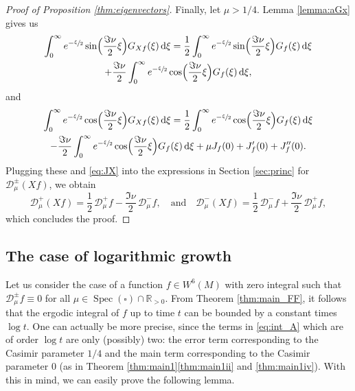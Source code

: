 \documentclass[11pt]{article}
\newcommand \R{\mathbb{R}}
\newcommand*{\diff}{\mathop{}\!\mathrm{d}}
\newcommand{\Dp}[1]{\mathcal{D}_\mu^{+} #1}
\newcommand{\Dm}[1]{\mathcal{D}_\mu^{-} #1}
\newcommand{\Dpm}[1]{\mathcal{D}_\mu^{\pm} #1}
\newcommand{\Dpmp}[1]{\mathcal{D}_\mu^{\pm}(#1)}
\DeclareMathOperator{\Spec}{Spec}
\theoremstyle{definition}
\begin{document}
\begin{proof}[{Proof of Proposition \ref{thm:eigenvectors}}]
Finally, let $\mu > 1/4$. Lemma \ref{lemma:aGx} gives us
\begin{multline*}
\int_0^\infty e^{-\sfrac{\xi}{2}} \sin\Bigl(\frac{\Im\nu}{2}\xi \Bigr) G_{Xf}(\xi) \diff \xi = \frac{1}{2} \int_0^\infty e^{-\sfrac{\xi}{2}} \sin\Bigl(\frac{\Im\nu}{2}\xi \Bigr) G_{f}(\xi) \diff \xi \\
+ \frac{\Im\nu}{2}\int_0^\infty e^{-\sfrac{\xi}{2}} \cos\Bigl(\frac{\Im\nu}{2}\xi \Bigr) G_{f}(\xi) \diff \xi,
\end{multline*}
and
\begin{multline*}
\int_0^\infty e^{-\sfrac{\xi}{2}} \cos\Bigl(\frac{\Im\nu}{2}\xi \Bigr) G_{Xf}(\xi) \diff \xi = \frac{1}{2} \int_0^\infty e^{-\sfrac{\xi}{2}} \cos\Bigl(\frac{\Im\nu}{2}\xi \Bigr) G_{f}(\xi) \diff \xi \\
 - \frac{\Im \nu}{2}\int_0^\infty e^{-\sfrac{\xi}{2}} \cos\Bigl(\frac{\Im\nu}{2}\xi \Bigr) G_{f}(\xi) \diff \xi + \mu J_f(0) + J_f'(0)+ J_f''(0).
\end{multline*}
Plugging these and \eqref{eq:JX} into the expressions in Section \ref{sec:princ} for $\Dpmp{Xf}$, we obtain
\[
\Dp{(Xf)}= \frac{1}{2}\, \Dp{f} - \frac{\Im\nu}{2}\, \Dm{f}, \quad\text{and}\quad \Dm{(Xf)}= \frac{1}{2}\, \Dm{f} + \frac{\Im\nu}{2}\, \Dp{f},
\]
which concludes the proof.
\end{proof}

\subsection{The case of logarithmic growth}\label{sec:log_growth}

Let us consider the case of a function $f \in W^6(M)$ with zero integral such that $\Dpm{f} \equiv 0$ for all $\mu \in \Spec(\square) \cap \R_{>0}$.
From Theorem \ref{thm:main_FF}, it follows that the ergodic integral of $f$ up to time $t$ can be bounded by a constant times $\log t$.
One can actually be more precise, since the terms in \eqref{eq:int_A} which are of order $\log t$ are only (possibly) two: the error term corresponding to the Casimir parameter $1/4$ and the main term corresponding to the Casimir parameter 0 (as in Theorem \ref{thm:main1}\eqref{thm:main1ii} and \eqref{thm:main1iv}). With this in mind, we can easily prove the following lemma.
\end{document}
